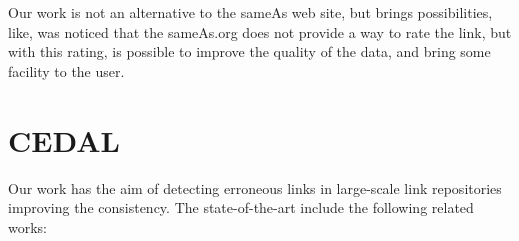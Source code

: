 Our work is not an alternative to the sameAs web site, but brings possibilities, like, was noticed that the sameAs.org does not provide a way to rate the link, but with this rating, is possible to improve the quality of the data, and bring some facility to the user.

\section{CEDAL}
Our work has the aim of detecting erroneous links in large-scale link repositories improving the consistency. The state-of-the-art include the following related works:


